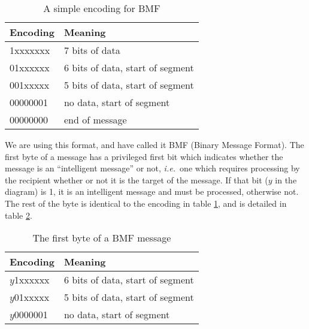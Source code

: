 \documentclass[pdftex,a4paper]{article}
\newcommand{\ie}{{\em i.e.\ }}
\begin{document}
\begin{table}[!h]
  \begin{center}
    \caption{A simple encoding for BMF}
    \label{tab:enc}
    \begin{tabular}{|l|p{6cm}|}
      \hline

      \textbf{Encoding} & \textbf{Meaning}\\

      \hline

      1xxxxxxx & 7 bits of data\\

      \hline

      01xxxxxx & 6 bits of data, start of segment\\

      \hline

      001xxxxx & 5 bits of data, start of segment\\

      \hline

      00000001 & no data, start of segment\\

      \hline

      00000000 & end of message\\

      \hline
    \end{tabular}
  \end{center}
\end{table}

We are using this format, and have called it BMF (Binary Message
Format). The first byte of a message has a privileged first bit which
indicates whether the message is an ``intelligent message'' or not,
\ie one which requires processing by the recipient whether or not it
is the target of the message. If that bit ($y$ in the diagram) is 1,
it is an intelligent message and must be processed, otherwise not. The
rest of the byte is identical to the encoding in table \ref{tab:enc},
and is detailed in table \ref{tab:enc2}.
\begin{table}[!h]
  \begin{center}
    \caption{The first byte of a BMF message}
    \label{tab:enc2}
    \begin{tabular}{|l|p{6cm}|}
      \hline

      \textbf{Encoding} & \textbf{Meaning}\\

      \hline

      $y$1xxxxxx & 6 bits of data, start of segment\\

      \hline

      $y$01xxxxx & 5 bits of data, start of segment\\

      \hline

      $y$0000001 & no data, start of segment\\

      \hline
    \end{tabular}
  \end{center}
\end{table}
\end{document}
